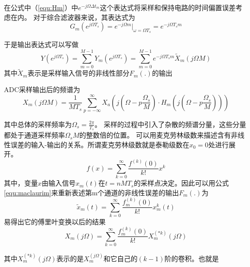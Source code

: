 在公式中（\ref{equ:Hm}）中$e^{-j\Omega \Delta {t_m}}$这个表达式将采样和保持电路的时间偏置误差考虑在内。
对于综合滤波器来说，其表达式为
\begin{equation}
	G_m(e^{j\Omega T_s})=e^{-j\Omega m} | _{\omega =\Omega T_s} = e^{-j\Omega T_s m}
\end{equation}



于是输出表达式可以写做
\begin{equation}
\label{equ:}
	Y\left(e^{j\Omega T_s}\right)=\sum_{m=0}^{M-1} Y_m\left(e^{j\Omega T_s}\right)=\sum_{m=0}^{M-1}e^{-j\Omega T_s m}{\tilde X_m(j\Omega M)}
\end{equation}
其中$\tilde X_m$表示是采样输入信号的非线性部分$F_m(.)$的输出

ADC采样输出后的频谱为
\begin{equation}
{X_m}\left( {j\Omega M} \right) = \frac{1}{{M{T_s}}}\sum\limits_{p =  - \infty }^\infty  {{X_a}\left( {j\left( {\Omega  - p\frac{{{\Omega _s}}}{M}} \right) \cdot {H_m}\left( {j\left( {\Omega  - p\frac{{{\Omega _s}}}{M}} \right)} \right)} \right)} 	
\end{equation}

其中总体的采样频率为$\Omega _s = \frac{2\pi}{T_s}$。
采样的过程中引入了杂散的频谱分量，这些分量都处于通道采样频率$\Omega _s M$的整数倍的位置。
可以用麦克劳林级数来描述含有非线性误差的输入-输出的关系。所谓麦克劳林级数就是泰勒级数在$x_0=0$处进行展开。
\begin{equation}
\label{equ:maclaurim}
	f(x)=\sum_{k=0}^{\infty}\frac{f^{(k)}(0)}{k!}x^k
\end{equation}
其中，变量$x$由输入信号$x_m(t)$在$t=nMT_s$的采样点决定。因此可以用公式\ref{equ:maclaurim}来重新表述第m个通道的非线性误差的输出$F_m(.)$为
\begin{equation}
	\tilde x_m(t)=\sum_{k=0}^{\infty}\frac{f^{(k)}_m(0)}{k!}x^k_m(t)
\end{equation}
易得出它的傅里叶变换以后的结果
\begin{equation}
	{X_m}\left( {j\Omega } \right) = \sum\limits_{k = 0}^\infty  {\frac{{f_m^{\left( k \right)}\left( 0 \right)}}{{k!}}X_m^{\left( {*k} \right)}\left( {j\Omega } \right)} 
\end{equation}

其中$X_m^{\left( {*k} \right)}\left( {j\Omega } \right)$表示的是$X_m^{\left( {j\Omega } \right)}$和它自己的$(k-1)$阶的卷积。也就是

